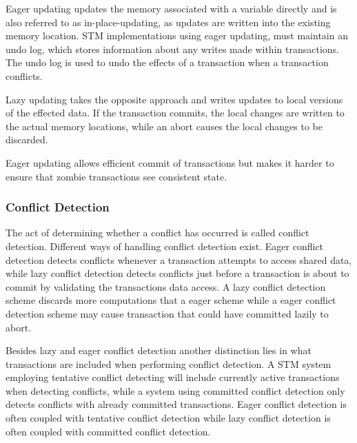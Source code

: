 Eager updating updates the memory associated with a variable directly and is also referred to as in-place-updating, as updates are written into the existing memory location\cite[p. 35]{afek2011lowering}. \ac{STM} implementations using eager updating, must maintain an undo log, which stores information about any writes made within transactions. The undo log is used to undo the effects of a transaction when a transaction conflicts\cite[p. 2084]{herlihy2011tm}.

Lazy updating takes the opposite approach and writes updates to local versions of the effected data\cite[p. 2084]{herlihy2011tm}. If the transaction commits, the local changes are written to the actual memory locations, while an abort causes the local changes to be discarded.

Eager updating allows efficient commit of transactions but makes it harder to ensure that zombie transactions see consistent state\cite[p. 2084]{herlihy2011tm}.

\subsubsection{Conflict Detection}
\label{sec:stm_conflict_detection}
The act of determining whether a conflict has occurred is called conflict detection\cite[p. 20]{harris2010transactional}. Different ways of handling conflict detection exist. Eager conflict detection detects conflicts whenever a transaction attempts to access shared data, while lazy conflict detection detects conflicts just before a transaction is about to commit by validating the transactions data access\cite[p. 21]{harris2010transactional}. A lazy conflict detection scheme discards more computations that a eager scheme while a eager conflict detection scheme may cause transaction that could have committed lazily to abort\cite[p. 21]{harris2010transactional}.

Besides lazy and eager conflict detection another distinction lies in what transactions are included when performing conflict detection. A \ac{STM} system employing tentative conflict detecting will include currently active transactions when detecting conflicts, while a system using committed conflict detection only detects conflicts with already committed transactions. Eager conflict detection is often coupled with tentative conflict detection while lazy conflict detection is often coupled with committed conflict detection\cite[p. 22]{harris2010transactional}.

